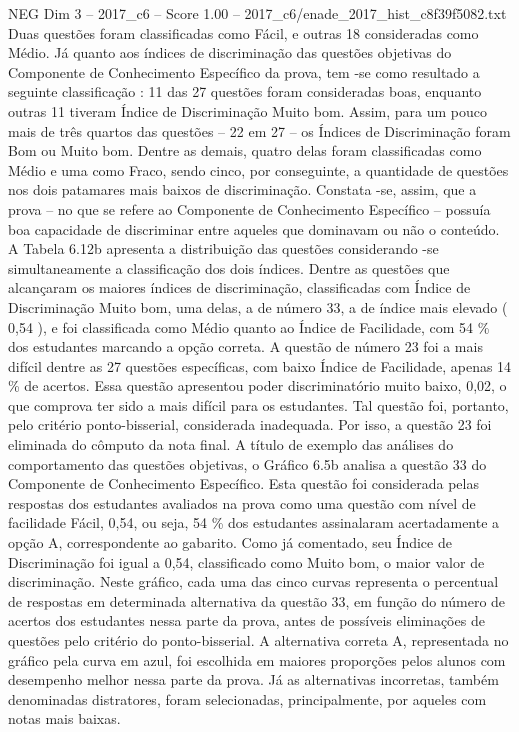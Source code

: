 \begin{textsample}{NEG Dim 3 – 2017\_c6 – Score 1.00 – 2017\_c6/enade\_2017\_hist\_c8f39f5082.txt}
Duas questões foram classificadas como Fácil, e outras 18 consideradas como Médio.
Já quanto aos índices de discriminação das questões objetivas do Componente de Conhecimento Específico da prova, tem -se como resultado a seguinte classificação : 11 das 27 questões foram consideradas boas, enquanto outras 11 tiveram Índice de Discriminação Muito bom.
Assim, para um pouco mais de três quartos das questões – 22 em 27 – os Índices de Discriminação foram Bom ou Muito bom.
Dentre as demais, quatro delas foram classificadas como Médio e uma como Fraco, sendo cinco, por conseguinte, a quantidade de questões nos dois patamares mais baixos de discriminação.
Constata -se, assim, que a prova – no que se refere ao Componente de Conhecimento Específico – possuía boa capacidade de discriminar entre aqueles que dominavam ou não o conteúdo.
A Tabela 6.12b apresenta a distribuição das questões considerando -se simultaneamente a classificação dos dois índices.
Dentre as questões que alcançaram os maiores índices de discriminação, classificadas com Índice de Discriminação Muito bom, uma delas, a de número 33, a de índice mais elevado ( 0,54 ), e foi classificada como Médio quanto ao Índice de Facilidade, com 54 \% dos estudantes marcando a opção correta.
A questão de número 23 foi a mais difícil dentre as 27 questões específicas, com baixo Índice de Facilidade, apenas 14 \% de acertos.
Essa questão apresentou poder discriminatório muito baixo, 0,02, o que comprova ter sido a mais difícil para os estudantes.
Tal questão foi, portanto, pelo critério ponto-bisserial, considerada inadequada.
Por isso, a questão 23 foi eliminada do cômputo da nota final.
A título de exemplo das análises do comportamento das questões objetivas, o Gráfico 6.5b analisa a questão 33 do Componente de Conhecimento Específico.
Esta questão foi considerada pelas respostas dos estudantes avaliados na prova como uma questão com nível de facilidade Fácil, 0,54, ou seja, 54 \% dos estudantes assinalaram acertadamente a opção A, correspondente ao gabarito.
Como já comentado, seu Índice de Discriminação foi igual a 0,54, classificado como Muito bom, o maior valor de discriminação.
Neste gráfico, cada uma das cinco curvas representa o percentual de respostas em determinada alternativa da questão 33, em função do número de acertos dos estudantes nessa parte da prova, antes de possíveis eliminações de questões pelo critério do ponto-bisserial.
A alternativa correta A, representada no gráfico pela curva em azul, foi escolhida em maiores proporções pelos alunos com desempenho melhor nessa parte da prova.
Já as alternativas incorretas, também denominadas distratores, foram selecionadas, principalmente, por aqueles com notas mais baixas.

\end{textsample}
